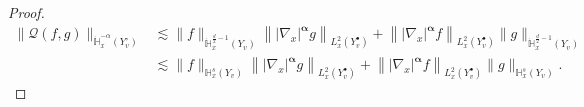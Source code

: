 \documentclass[10pt]{amsart}
\theoremstyle{definition}\newtheorem{defi}[theo]{Definition}\newtheorem{rema}[theo]{Remark}\newtheorem{exam}[theo]{Example}\newtheorem{exem}[theo]{Example}\newtheorem{nota}[theo]{Notation}
\newcommand{\bbH}{\mathbb{H}}
\newcommand{\QQ}{\mathcal{Q}}
\newcommand{\Sg}{Y}
\newcommand{\Sgp}{Y^{\bullet}}
\newcommand{\Sgm}{Y^{\circ}}
\begin{document}
\begin{proof}
\begin{equation*}
\begin{split}
\| \QQ(f, g) \|_{\dot{\bbH}^{-\alpha}_x \left(\Sgm_v \right) } &\lesssim \| f \|_{ \dot{\bbH}_x^{\frac{d}{2} - 1} \left(\Sg_v \right) } \left\| | \nabla_{x} |^{\boldsymbol{\alpha}} g \right\|_{ L^2_x \left(\Sgp_v \right) } + \left\| | \nabla_x |^{\boldsymbol{\alpha}} f \right\|_{ L^2_x\left(\Sgp_v \right) } \| g \|_{ \dot{\bbH}^{\frac{d}{2} - 1}_x \left(\Sg_v \right) } \\
&\lesssim \| f \|_{ \bbH^s_x \left(\Sg_v \right) } \left\| | \nabla_{x} |^{\boldsymbol{\alpha}} g \right\|_{ L^2_x \left(\Sgp_v \right) } + \left\| | \nabla_{x} |^{\boldsymbol{\alpha}} f \right\|_{ L^2_x \left(\Sgp_v \right) } \| g \|_{ \bbH^s_x \left(\Sg_v \right) }.
\end{split}
\end{equation*}


\end{proof}
\end{document}
